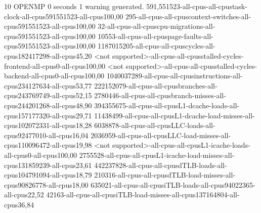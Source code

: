 
10
OPENMP
0 seconds
1 warning generated.
591,551523-all-cpus-all-cpustask-clock-all-cpus591551523-all-cpus100,00
295-all-cpus-all-cpuscontext-switches-all-cpus591551523-all-cpus100,00
32-all-cpus-all-cpuscpu-migrations-all-cpus591551523-all-cpus100,00
10553-all-cpus-all-cpuspage-faults-all-cpus591551523-all-cpus100,00
1187015205-all-cpus-all-cpuscycles-all-cpus182417298-all-cpus45,20
<not supported>-all-cpus-all-cpusstalled-cycles-frontend-all-cpus0-all-cpus100,00
<not supported>-all-cpus-all-cpusstalled-cycles-backend-all-cpus0-all-cpus100,00
1040037289-all-cpus-all-cpusinstructions-all-cpus234127634-all-cpus53,77
222152079-all-cpus-all-cpusbranches-all-cpus243769749-all-cpus52,15
2780446-all-cpus-all-cpusbranch-misses-all-cpus244201268-all-cpus48,90
394355675-all-cpus-all-cpusL1-dcache-loads-all-cpus157177320-all-cpus29,71
11438499-all-cpus-all-cpusL1-dcache-load-misses-all-cpus102072331-all-cpus18,28
6038878-all-cpus-all-cpusLLC-loads-all-cpus92477010-all-cpus16,04
2036959-all-cpus-all-cpusLLC-load-misses-all-cpus110096472-all-cpus19,98
<not supported>-all-cpus-all-cpusL1-icache-loads-all-cpus0-all-cpus100,00
2755528-all-cpus-all-cpusL1-icache-load-misses-all-cpus131859239-all-cpus23,61
442237828-all-cpus-all-cpusdTLB-loads-all-cpus104791094-all-cpus18,79
210316-all-cpus-all-cpusdTLB-load-misses-all-cpus90826778-all-cpus18,00
635021-all-cpus-all-cpusiTLB-loads-all-cpus94022365-all-cpus22,52
42163-all-cpus-all-cpusiTLB-load-misses-all-cpus137164804-all-cpus36,84
